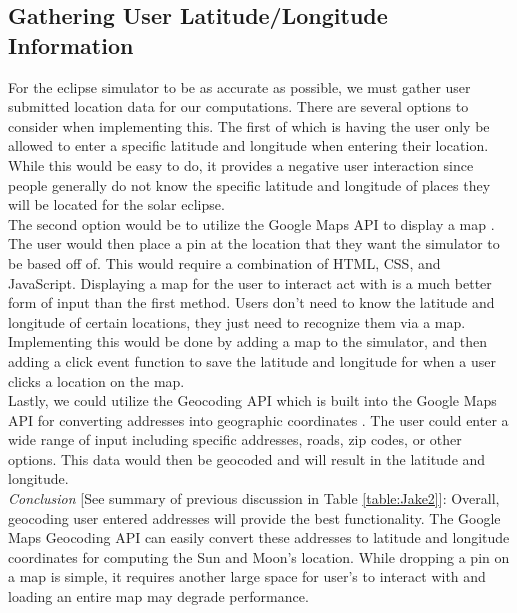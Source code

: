 \documentclass[10pt, onecolumn, draftclsnofoot, letterpaper, compsoc]{IEEEtran}
\begin{document}
\subsection{Gathering User Latitude/Longitude Information}

For the eclipse simulator to be as accurate as possible, we must gather user
submitted location data for our computations. There are several options to
consider when implementing this. The first of which is having the user only be
allowed to enter a specific latitude and longitude when entering their
location. While this would be easy to do, it provides a negative user
interaction since people generally do not know the specific latitude and
longitude of places they will be located for the solar eclipse. \\

The second option would be to utilize the Google Maps API to display a map
\cite{jsAPI}.
The user would then place a pin at the location that they want the simulator
to be based off of. This would require a combination of HTML, CSS, and
JavaScript. Displaying a map for the user to interact act with is a much
better form of input than the first method. Users don't need to know the
latitude and longitude of certain locations, they just need to recognize
them via a map. Implementing this would be done by adding a map to the
simulator, and then adding a click event function to save the latitude and
longitude for when a user clicks a location on the map. \\

Lastly, we could utilize the Geocoding API which is built into the Google Maps
API for converting addresses into geographic coordinates \cite{jsGEO}.
The user could enter a wide range of input including specific addresses,
roads, zip codes, or other options. This data would then be geocoded and will
result in the latitude and longitude. \\

\textit{Conclusion} [See summary of previous discussion in Table \ref{table:Jake2}]:
Overall, geocoding user entered addresses will provide the
best functionality. The Google Maps Geocoding API can easily convert these
addresses to latitude and longitude coordinates for computing the Sun and
Moon's location. While dropping a pin on a map is simple, it requires
another large space for user's to interact with and loading an entire
map may degrade performance. \\
\end{document}
